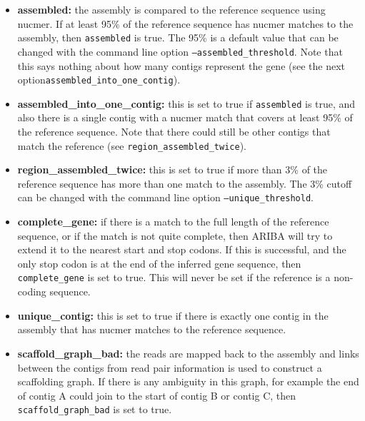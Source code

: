 \documentclass[11pt, a4paper]{article}
\begin{document}
\begin{itemize}
  \item \textbf{assembled:} the assembly is compared to the reference sequence using nucmer.
    If at least 95\% of the reference sequence has nucmer matches to the
    assembly, then \texttt{assembled} is true.
    The 95\% is a default value that can
    be changed with the command line option \texttt{--assembled\_threshold}.
    Note that this says nothing about how many contigs represent the gene
    (see the next option\newline \texttt{assembled\_into\_one\_contig}).

  \item \textbf{assembled\_into\_one\_contig:} this is set to true if
    \texttt{assembled} is true, and also there is a single contig with a nucmer
    match that covers at least 95\% of the reference sequence. Note that there
    could still be other contigs that match the reference (see
    \texttt{region\_assembled\_twice}).

  \item \textbf{region\_assembled\_twice:} this is set to true if more than 3\%
    of the reference sequence has more than one match to the assembly. The 3\%
    cutoff can be changed with the command line
    option \texttt{--unique\_threshold}.

  \item \textbf{complete\_gene:} if there is a match to the full length of the
    reference sequence, or if the match is not quite complete, then ARIBA
    will try to extend it to the nearest start and stop codons. If this is
    successful, and the only stop codon is at the end of the inferred gene
    sequence, then \texttt{complete\_gene} is set to true.
    This will never be set if the reference is a non-coding sequence.

  \item \textbf{unique\_contig:} this is set to true if there is exactly one
    contig in the assembly that has nucmer matches to the reference
    sequence.

  \item \textbf{scaffold\_graph\_bad:} the reads are mapped back to the
    assembly and links between the contigs from read pair information is used
    to construct a scaffolding graph. If there is any ambiguity in this
    graph, for example the end of contig A could join to the start of contig
    B or contig C, then \texttt{scaffold\_graph\_bad} is set to true.


\end{itemize}
\end{document}
